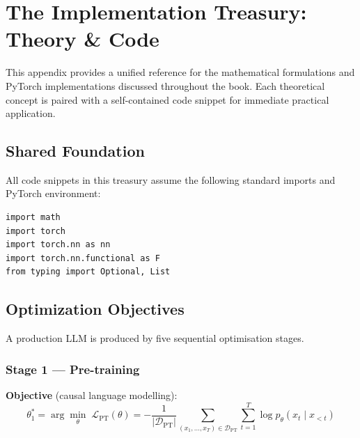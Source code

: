\chapter{The Implementation Treasury: Theory \& Code}
\label{app:treasury}

This appendix provides a unified reference for the mathematical formulations and 
PyTorch implementations discussed throughout the book. Each theoretical concept 
is paired with a self-contained code snippet for immediate practical application.

\section{Shared Foundation}

All code snippets in this treasury assume the following standard imports and 
PyTorch environment:

\begin{lstlisting}[style=pythonstyle, caption={Shared imports}, label=lst:imports]
import math
import torch
import torch.nn as nn
import torch.nn.functional as F
from typing import Optional, List
\end{lstlisting}

\section{Optimization Objectives}
\label{app:objectives}
\label{app:pipeline}

A production LLM is produced by five sequential optimisation stages.

\subsection{Stage 1 --- Pre-training}
\label{form:ntp}

\textbf{Objective} (causal language modelling):
\[
  \theta_1^* = \arg\min_\theta\; \mathcal{L}_\mathrm{PT}(\theta) = -\frac{1}{|\mathcal{D}_\mathrm{PT}|}\sum_{(x_1,\ldots,x_T)\in\mathcal{D}_\mathrm{PT}} \sum_{t=1}^{T} \log p_\theta(x_t \mid x_{<t})
\]

